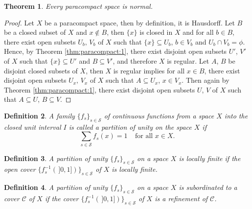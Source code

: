 \documentclass[12pt,oneside,english]{amsbook}
\numberwithin{equation}{section} %
\numberwithin{figure}{section} %
\theoremstyle{plain}
\numberwithin{section}{chapter}
\newtheorem{thm}{Theorem}[section]
\theoremstyle{plain}
\newtheorem{defn}[thm]{Definition}
\begin{document}
\begin{thm} \label{thm:paracompact:2}
  Every paracompact space is normal.
\end{thm}
\begin{proof}
  Let $X$ be a paracompact space, then by definition, it is Hausdorff. Let $B$ be a closed subset of $X$ and $x  \notin  B$, then $\{x\}$ is closed in $X$ and for all $b  \in  B$, there exist open subsets $U_{b}, \, V_{b}$ of $X$ such that $\{x\}  \subseteq  U_{b}$, $b  \in V_{b}$ and $U_{b} \cap V_{b}  =  \phi$. Hence, by Theorem \ref{thm:paracompact:1}, there exist disjoint open subsets $U'$, $V'$ of $X$ such that $\{x\}  \subseteq U'$ and $B  \subseteq  V'$, and therefore $X$ is regular. Let $A$, $B$ be disjoint closed subsets of $X$, then $X$ is regular implies for all $x  \in  B$, there exist disjoint open subsets $U_{x}, \, V_{x}$ of $X$ such that $A  \subseteq  U_{x}$, $x  \in  V_{x}$. Then again by Theorem \ref{thm:paracompact:1}, there exist disjoint open subsets $U$, $V$ of $X$ such that $A  \subseteq  U$, $B  \subseteq  V$.
\end{proof}

\begin{defn}
  A family $\{f_{s}\}_{s  \in  \mathcal{S}}$ of continuous functions from a space $X$ into the closed unit interval $I$ is called a partition of unity on the space $X$ if $$\sum_{s  \in  \mathcal{S}} f_{s}(x)  =  1 \;\;\;\; \text{for all } x  \in X.$$
\end{defn}


\begin{defn}
  A partition of unity $\{f_{s}\}_{s \in \mathcal{S}}$ on a space $X$ is locally finite if the open cover $\{f_{s}^{-1}(\,]0,1])\}_{s \in \mathcal{S}}$ of $X$ is locally finite.
\end{defn}

\begin{defn}
  A partition of unity $\{f_{s}\}_{s \in \mathcal{S}}$ on a space $X$ is subordinated to a cover $\mathcal{C}$ of $X$ if the cover $\{f_{s}^{-1}(\,]0,1])\}_{s \in \mathcal{S}}$ of $X$ is a refinement of $\mathcal{C}$. 
\end{defn}
\end{document}
